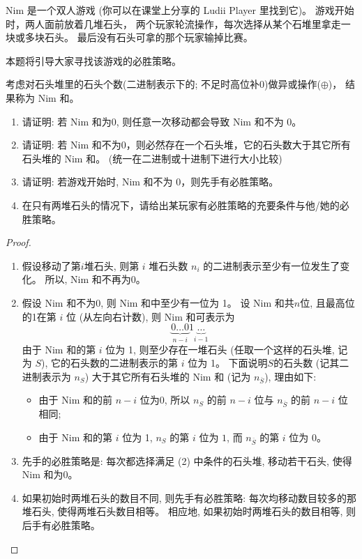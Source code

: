 \documentclass[a4paper, justified]{tufte-handout}
\begin{document}
\begin{problem}[Nim Game \score{6 = 1 + 2 + 2 + 1}]
  Nim 是一个双人游戏 (你可以在课堂上分享的 Ludii Player 里找到它)。
  游戏开始时，两人面前放着几堆石头，
  两个玩家轮流操作，每次选择从某个石堆里拿走一块或多块石头。
  最后没有石头可拿的那个玩家输掉比赛。


  本题将引导大家寻找该游戏的必胜策略。

  考虑对石头堆里的石头个数(二进制表示下的; 不足时高位补0)做异或操作($\oplus$)，
  结果称为 Nim 和。

  \begin{enumerate}[(1)]
    \item 请证明: 若 Nim 和为0, 则任意一次移动都会导致 Nim 和不为 0。
    \item 请证明: 若 Nim 和不为0，则必然存在一个石头堆，它的石头数大于其它所有石头堆的 Nim 和。
      (统一在二进制或十进制下进行大小比较)
    \item 请证明: 若游戏开始时, Nim 和不为 0，则先手有必胜策略。
    \item 在只有两堆石头的情况下，请给出某玩家有必胜策略的充要条件与他/她的必胜策略。
  \end{enumerate}
\end{problem}

\begin{proof}
  \begin{enumerate}[(1)]
    \item 假设移动了第$i$堆石头, 则第 $i$ 堆石头数 $n_{i}$ 的二进制表示至少有一位发生了变化。
      所以, Nim 和不再为0。
    \item 假设 Nim 和不为0, 则 Nim 和中至少有一位为 1。
      设 Nim 和共$n$位, 且最高位的1在第 $i$ 位 (从左向右计数), 则 Nim 和可表示为
      \[
        \underbrace{0 \dots 0}_{n-i} 1 \underbrace{\dots}_{i-1}
      \]
      由于 Nim 和的第 $i$ 位为 1, 则至少存在一堆石头 (任取一个这样的石头堆, 记为 $S$),
      它的石头数的二进制表示的第 $i$ 位为 1。
      下面说明$S$的石头数 (记其二进制表示为 $n_{S}$)
      大于其它所有石头堆的 Nim 和 (记为 $n_{\overline{S}}$), 理由如下:
      \begin{itemize}
        \item 由于 Nim 和的前 $n-i$ 位为0,
          所以 $n_{S}$ 的前 $n-i$ 位与 $n_{\overline{S}}$ 的前 $n-i$ 位相同;
        \item 由于 Nim 和的第 $i$ 位为 1,
          $n_{S}$ 的第 $i$ 位为 $1$, 而 $n_{\overline{S}}$ 的第 $i$ 位为 0。
      \end{itemize}
    \item 先手的必胜策略是: 每次都选择满足 (2) 中条件的石头堆, 移动若干石头, 使得 Nim 和为0。
    \item 如果初始时两堆石头的数目不同, 则先手有必胜策略: 每次均移动数目较多的那堆石头, 使得两堆石头数目相等。
      相应地, 如果初始时两堆石头的数目相等, 则后手有必胜策略。
  \end{enumerate}
\end{proof}
\end{document}
